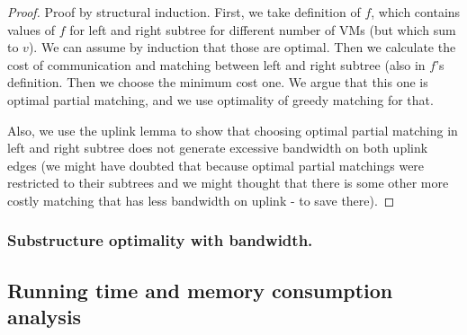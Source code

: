 \begin{proof}
Proof by structural induction. First, we take definition of $f$, which contains values of $f$ for left and right subtree for different number of VMs (but which sum to $v$). We can assume by induction that those are optimal. Then we calculate the cost of communication and matching between left and right subtree (also in $f$'s definition. Then we choose the minimum cost one. We argue that this one is optimal partial matching, and we use optimality of greedy matching for that.

Also, we use the uplink lemma to show that choosing optimal partial matching in left and right subtree does not generate excessive bandwidth on both uplink edges (we might have doubted that because optimal partial matchings were restricted to their subtrees and we might thought that there is some other more costly matching that has less bandwidth on uplink - to save there).
\end{proof}

\subsubsection{Substructure optimality with bandwidth.}
\subsection{Running time and memory consumption analysis}
